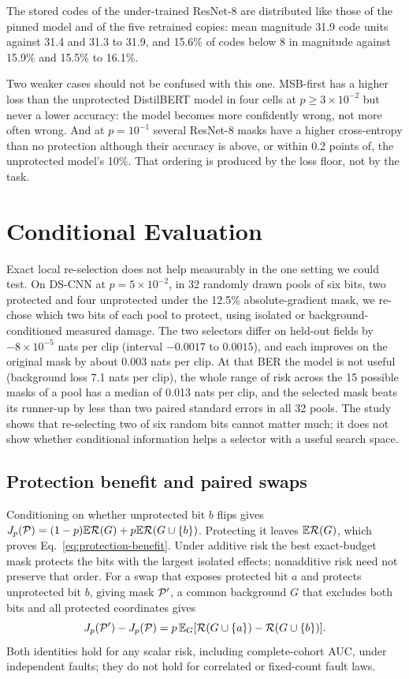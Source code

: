 The stored codes of the under-trained ResNet-8 are distributed like those of the pinned model and of the five retrained copies: mean magnitude 31.9 code units against 31.4 and 31.3 to 31.9, and 15.6\% of codes below 8 in magnitude against 15.9\% and 15.5\% to 16.1\%.

Two weaker cases should not be confused with this one. MSB-first has a higher loss than the unprotected DistilBERT model in four cells at $p\ge3\times10^{-2}$ but never a lower accuracy: the model becomes more confidently wrong, not more often wrong. And at $p=10^{-1}$ several ResNet-8 masks have a higher cross-entropy than no protection although their accuracy is above, or within 0.2 points of, the unprotected model's 10\%. That ordering is produced by the loss floor, not by the task.

\section{Conditional Evaluation}\label{app:proofs}
Exact local re-selection does not help measurably in the one setting we could test. On DS-CNN at $p=5\times10^{-2}$, in 32 randomly drawn pools of six bits, two protected and four unprotected under the 12.5\% absolute-gradient mask, we re-chose which two bits of each pool to protect, using isolated or background-conditioned measured damage. The two selectors differ on held-out fields by $-8\times10^{-5}$ nats per clip (interval $-0.0017$ to $0.0015$), and each improves on the original mask by about $0.003$ nats per clip. At that BER the model is not useful (background loss 7.1 nats per clip), the whole range of risk across the 15 possible masks of a pool has a median of 0.013 nats per clip, and the selected mask beats its runner-up by less than two paired standard errors in all 32 pools. The study shows that re-selecting two of six random bits cannot matter much; it does not show whether conditional information helps a selector with a useful search space.

\subsection{Protection benefit and paired swaps}
Conditioning on whether unprotected bit $b$ flips gives $J_p(\mathcal{P})=(1-p)\mathbb{E}\mathcal{R}(G)+p\mathbb{E}\mathcal{R}(G\cup\{b\})$. Protecting it leaves $\mathbb{E}\mathcal{R}(G)$, which proves Eq.~\eqref{eq:protection-benefit}. Under additive risk the best exact-budget mask protects the bits with the largest isolated effects; nonadditive risk need not preserve that order. For a swap that exposes protected bit $a$ and protects unprotected bit $b$, giving mask $\mathcal{P}'$, a common background $G$ that excludes both bits and all protected coordinates gives
\begin{equation}\label{eq:swap}
J_p(\mathcal{P}')-J_p(\mathcal{P})=p\,\mathbb{E}_G[\mathcal{R}(G\cup\{a\})-\mathcal{R}(G\cup\{b\})].
\end{equation}
Both identities hold for any scalar risk, including complete-cohort AUC, under independent faults; they do not hold for correlated or fixed-count fault laws.

